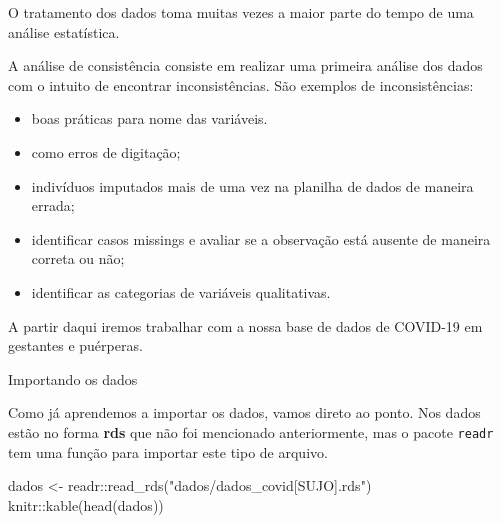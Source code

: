 \documentclass[
  letterpaper,
  DIV=11,
  numbers=noendperiod]{scrreprt}
\newenvironment{Shaded}{\begin{snugshade}}{\end{snugshade}}
\newcommand{\FunctionTok}[1]{\textcolor[rgb]{0.28,0.35,0.67}{#1}}
\newcommand{\NormalTok}[1]{\textcolor[rgb]{0.00,0.23,0.31}{#1}}
\newcommand{\OtherTok}[1]{\textcolor[rgb]{0.00,0.23,0.31}{#1}}
\newcommand{\SpecialCharTok}[1]{\textcolor[rgb]{0.37,0.37,0.37}{#1}}
\newcommand{\StringTok}[1]{\textcolor[rgb]{0.13,0.47,0.30}{#1}}
\begin{document}
O tratamento dos dados toma muitas vezes a maior parte do tempo de uma
análise estatística.

A análise de consistência consiste em realizar uma primeira análise dos
dados com o intuito de encontrar inconsistências. São exemplos de
inconsistências:

\begin{itemize}
\item
  boas práticas para nome das variáveis.
\item
  como erros de digitação;
\item
  indivíduos imputados mais de uma vez na planilha de dados de maneira
  errada;
\item
  identificar casos missings e avaliar se a observação está ausente de
  maneira correta ou não;
\item
  identificar as categorias de variáveis qualitativas.
\end{itemize}

A partir daqui iremos trabalhar com a nossa base de dados de COVID-19 em
gestantes e puérperas.

Importando os dados

Como já aprendemos a importar os dados, vamos direto ao ponto. Nos dados
estão no forma \textbf{rds} que não foi mencionado anteriormente, mas o
pacote \texttt{readr} tem uma função para importar este tipo de arquivo.

\begin{Shaded}
\begin{Highlighting}[]
\NormalTok{dados }\OtherTok{\textless{}{-}}\NormalTok{ readr}\SpecialCharTok{::}\FunctionTok{read\_rds}\NormalTok{(}\StringTok{"dados/dados\_covid[SUJO].rds"}\NormalTok{)}
\NormalTok{knitr}\SpecialCharTok{::}\FunctionTok{kable}\NormalTok{(}\FunctionTok{head}\NormalTok{(dados))}
\end{Highlighting}
\end{Shaded}
\end{document}
